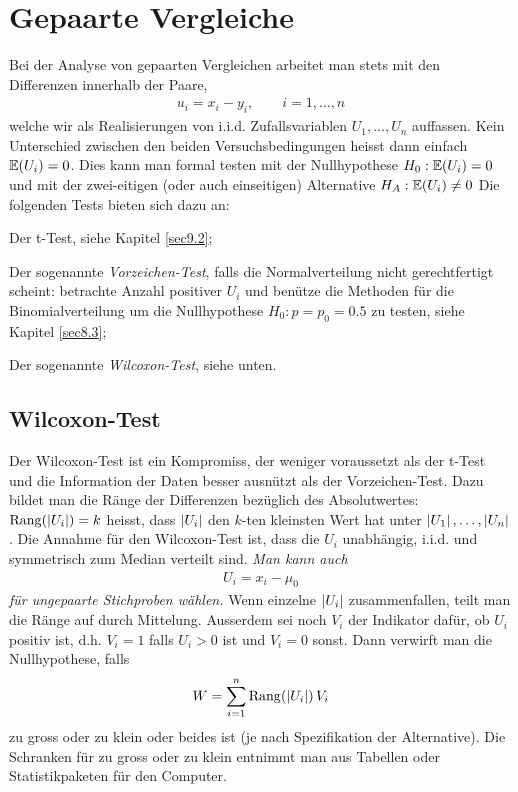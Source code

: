 \section{Gepaarte Vergleiche}
\label{sec11.2}
Bei der Analyse von gepaarten Vergleichen arbeitet man stets mit den Differenzen innerhalb der Paare,
\begin{gather*}
	u_i=x_i-y_i,\qquad i=1,\ldots,n
\end{gather*}
welche wir als Realisierungen von i.i.d. Zufallsvariablen $U_1,\ldots,U_n$ auffassen. Kein Unterschied zwischen den beiden Versuchsbedingungen heisst dann einfach $\operatorname{\mathbb E}(U_i)=0$. Dies kann man formal testen mit der Nullhypothese $H_0:\operatorname{\mathbb E}(U_i)=0$ und mit der zwei-eitigen (oder auch einseitigen) Alternative $H_A:\operatorname{\mathbb E}(U_i)\neq 0$ Die folgenden Tests bieten sich dazu an:
\begin{compactenum}[1.]
	\item Der t-Test, siehe Kapitel \ref{sec9.2};
	\item Der sogenannte \emph{Vorzeichen-Test}, falls die Normalverteilung nicht gerechtfertigt scheint: betrachte Anzahl positiver $U_i$ und benütze die Methoden für die Binomialverteilung um die Nullhypothese $H_0:p=p_0=0.5$ zu testen, siehe Kapitel \ref{sec8.3};
	\item Der sogenannte \emph{Wilcoxon-Test}, siehe unten.
\end{compactenum}
\subsection{Wilcoxon-Test}
Der Wilcoxon-Test ist ein Kompromiss, der weniger voraussetzt als der t-Test und die Information der Daten besser ausnützt als der Vorzeichen-Test. Dazu bildet man die Ränge der Differenzen bezüglich des Absolutwertes: $\operatorname{Rang}(\left\lvert U_i \right\rvert)=k$ heisst, dass $\left\lvert U_i \right\rvert$ den $k$-ten kleinsten Wert hat unter $\left\lvert U_1 \right\rvert,\ldots,\left\lvert U_n \right\rvert$. Die Annahme für den Wilcoxon-Test ist, dass die $U_i$ unabhängig, i.i.d. und symmetrisch zum Median verteilt sind. \emph{Man kann auch}
\begin{gather*}
	U_i=x_i-\mu_0
\end{gather*}
\emph{für ungepaarte Stichproben wählen.}
Wenn einzelne $\left\lvert U_i \right\rvert$ zusammenfallen, teilt man die Ränge auf durch Mittelung. Ausserdem sei noch $V_i$ der Indikator dafür, ob $U_i$ positiv ist, d.h. $V_i=1$ falls $U_i>0$ ist und $V_i=0$ sonst. Dann verwirft man die Nullhypothese, falls
\begin{gather*}
	W=\sum_{i=1}^{n}\operatorname{Rang}\!\left( \left\lvert U_i \right\rvert \right)V_i
\end{gather*}
zu gross oder zu klein oder beides ist (je nach Spezifikation der Alternative). Die Schranken für zu gross oder zu klein entnimmt man aus Tabellen oder Statistikpaketen für den Computer.


